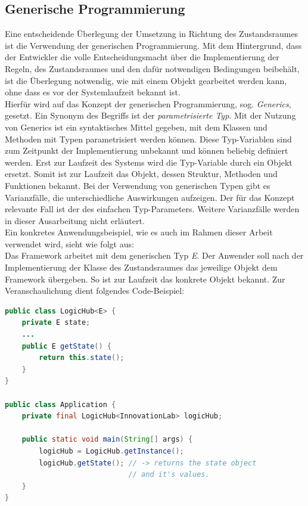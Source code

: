 \subsection{Generische Programmierung} %
\label{subsec:java_generics}
    Eine entscheidende Überlegung der Umsetzung in Richtung des Zustandsraumes ist die Verwendung der generischen Programmierung. 
    Mit dem Hintergrund, dass der Entwickler die volle Entscheidungsmacht über die Implementierung der 
    Regeln, des Zustandsraumes und den dafür notwendigen Bedingungen beibehält, ist die Überlegung  
    notwendig, wie mit einem Objekt gearbeitet werden kann, ohne dass es vor der Systemlaufzeit bekannt ist. 
    \\
    \linebreak
    Hierfür wird auf das Konzept der generischen Programmierung, sog. \textit{Generics}, gesetzt. Ein Synonym 
    des Begriffs ist der \textit{parametrisierte Typ}. Mit der Nutzung von Generics ist ein syntaktisches Mittel 
    gegeben, mit dem Klassen und Methoden mit Typen parametrisiert werden können. Diese Typ-Variablen sind zum 
    Zeitpunkt der Implementierung unbekannt und können beliebig definiert werden. Erst zur Laufzeit des Systems 
    wird die Typ-Variable durch ein Objekt ersetzt. Somit ist zur Laufzeit das 
    Objekt, dessen Struktur, Methoden und Funktionen bekannt. Bei der Verwendung von generischen Typen gibt es 
    Varianzfälle, die unterschiedliche Auswirkungen aufzeigen. Der für das Konzept relevante Fall ist der des 
    einfachen Typ-Parameters. Weitere Varianzfälle werden in dieser Ausarbeitung nicht erläutert. 
    \\
    \linebreak
    Ein konkretes Anwendungsbeispiel, wie es 
    auch im Rahmen dieser Arbeit verwendet wird, sieht wie folgt aus:
    \\
    Das Framework arbeitet mit dem generischen Typ \textit{E}. Der Anwender soll nach der Implementierung der Klasse des Zustandsraumes das 
    jeweilige Objekt dem Framework übergeben. So ist zur Laufzeit das konkrete Objekt bekannt. Zur Veranschaulichung dient folgendes Code-Beispiel:
\begin{lstlisting}[language=Java, frame=lines, xleftmargin=\parindent, style=algoBericht, label={code:generics}, captionpos=b, caption={Zustandsobjekt als Typ-Variable}]
public class LogicHub<E> {
    private E state;
    ...
    public E getState() {
        return this.state();
    }
}

public class Application {
    private final LogicHub<InnovationLab> logicHub;

    public static void main(String[] args) {
        logicHub = LogicHub.getInstance();
        logicHub.getState(); // -> returns the state object 
                             // and it's values.
    }
}
\end{lstlisting}

